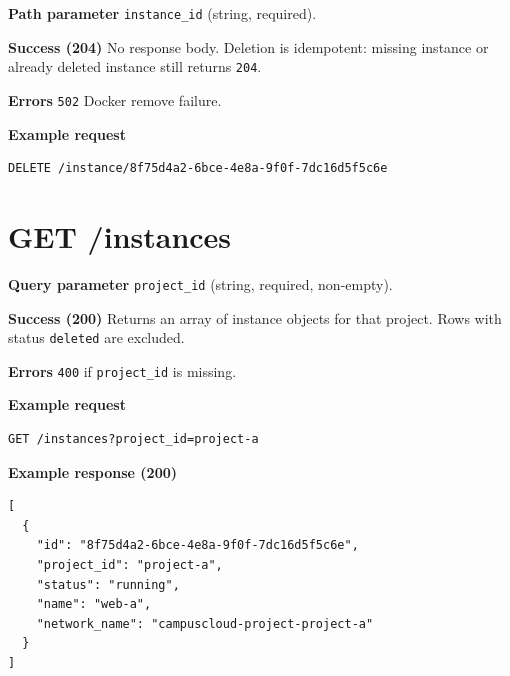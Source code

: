 \documentclass[11pt]{article}
\begin{document}
\textbf{Path parameter}
\texttt{instance\_id} (string, required).

\textbf{Success (204)}
No response body. Deletion is idempotent: missing instance or already deleted instance still returns
\texttt{204}.

\textbf{Errors}
\texttt{502} Docker remove failure.

\textbf{Example request}
\begin{verbatim}
DELETE /instance/8f75d4a2-6bce-4e8a-9f0f-7dc16d5f5c6e
\end{verbatim}

\section*{GET /instances}

\textbf{Query parameter}
\texttt{project\_id} (string, required, non-empty).

\textbf{Success (200)}
Returns an array of instance objects for that project. Rows with status \texttt{deleted} are excluded.

\textbf{Errors}
\texttt{400} if \texttt{project\_id} is missing.

\textbf{Example request}
\begin{verbatim}
GET /instances?project_id=project-a
\end{verbatim}

\textbf{Example response (200)}
\begin{verbatim}
[
  {
    "id": "8f75d4a2-6bce-4e8a-9f0f-7dc16d5f5c6e",
    "project_id": "project-a",
    "status": "running",
    "name": "web-a",
    "network_name": "campuscloud-project-project-a"
  }
]
\end{verbatim}
\end{document}
